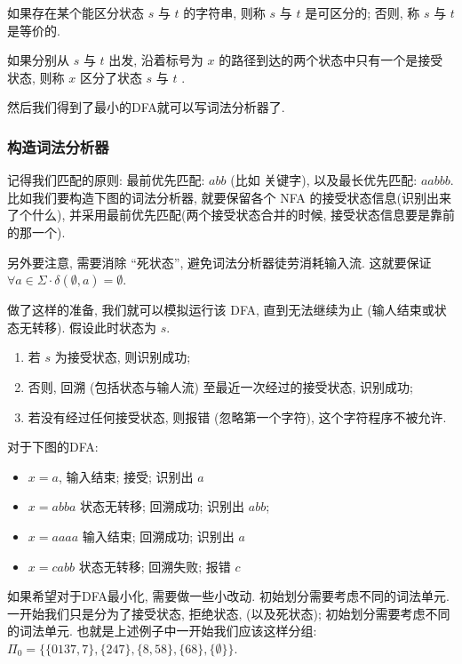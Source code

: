 \documentclass{ctexart}
\begin{document}
\begin{definition}
如果存在某个能区分状态 $s$ 与 $t$ 的字符串, 则称 $s$ 与 $t$ 是可区分的; 否则, 称 $s$ 与 $t$ 是等价的.
    
\end{definition}

\begin{definition}
    如果分别从 $s$ 与 $t$ 出发, 沿着标号为 $x$ 的路径到达的两个状态中只有一个是接受状态, 则称 $x$ 区分了状态 $s$ 与 $t$ .
\end{definition}

然后我们得到了最小的DFA就可以写词法分析器了. 

\subsubsection{构造词法分析器} 记得我们匹配的原则: 最前优先匹配: $a b b$ (比如 关键字), 以及最长优先匹配: $a a b b b$. 比如我们要构造下图的词法分析器, 就要保留各个 NFA 的接受状态信息(识别出来了个什么), 并采用最前优先匹配(两个接受状态合并的时候, 接受状态信息要是靠前的那一个).


另外要注意, 需要消除 “死状态”, 避免词法分析器徒劳消耗输入流. 这就要保证$\forall a \in \Sigma \cdot \delta(\emptyset, a)=\emptyset$. 

做了这样的准备, 我们就可以模拟运行该 DFA, 直到无法继续为止 (输人结束或状态无转移). 假设此时状态为 $s$.

\begin{enumerate}
    \item 若 $s$ 为接受状态, 则识别成功;
    \item 否则, 回溯 (包括状态与输人流) 至最近一次经过的接受状态, 识别成功;
    \item 若没有经过任何接受状态, 则报错 (忽略第一个字符), 这个字符程序不被允许. 
\end{enumerate}

\begin{example}
    对于下图的DFA: 


    \begin{itemize}
        \item $x=a$, 输入结束; 接受; 识别出 $a$
        \item $x=a b b a$ 状态无转移; 回溯成功; 识别出 $a b b$; 
        \item $x=a a a a$ 输入结束; 回溯成功; 识别出 $a$
        \item $x=c a b b$ 状态无转移; 回溯失败; 报错 $c$
    \end{itemize}

\end{example}

如果希望对于DFA最小化, 需要做一些小改动. 初始划分需要考虑不同的词法单元. 一开始我们只是分为了接受状态, 拒绝状态, (以及死状态); 初始划分需要考虑不同的词法单元. 也就是上述例子中一开始我们应该这样分组: $\Pi_0=\{\{0137,7\},\{247\},\{8,58\},\{68\},\{\emptyset\}\}$. 
\end{document}
